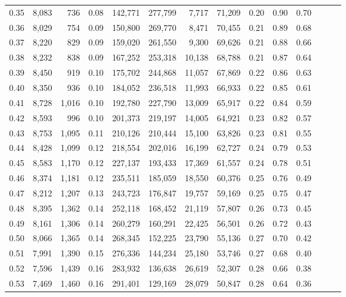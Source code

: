 \begin{tabular}{rrrrrrrrrrrrrr}
0.35 &  8,083 &    736 &  0.08 &  142,771 &  277,799 &   7,717 &  71,209 &  0.20 &  0.90 &      0.70 \\
0.36 &  8,029 &    754 &  0.09 &  150,800 &  269,770 &   8,471 &  70,455 &  0.21 &  0.89 &      0.68 \\
0.37 &  8,220 &    829 &  0.09 &  159,020 &  261,550 &   9,300 &  69,626 &  0.21 &  0.88 &      0.66 \\
0.38 &  8,232 &    838 &  0.09 &  167,252 &  253,318 &  10,138 &  68,788 &  0.21 &  0.87 &      0.64 \\
0.39 &  8,450 &    919 &  0.10 &  175,702 &  244,868 &  11,057 &  67,869 &  0.22 &  0.86 &      0.63 \\
0.40 &  8,350 &    936 &  0.10 &  184,052 &  236,518 &  11,993 &  66,933 &  0.22 &  0.85 &      0.61 \\
0.41 &  8,728 &  1,016 &  0.10 &  192,780 &  227,790 &  13,009 &  65,917 &  0.22 &  0.84 &      0.59 \\
0.42 &  8,593 &    996 &  0.10 &  201,373 &  219,197 &  14,005 &  64,921 &  0.23 &  0.82 &      0.57 \\
0.43 &  8,753 &  1,095 &  0.11 &  210,126 &  210,444 &  15,100 &  63,826 &  0.23 &  0.81 &      0.55 \\
0.44 &  8,428 &  1,099 &  0.12 &  218,554 &  202,016 &  16,199 &  62,727 &  0.24 &  0.79 &      0.53 \\
0.45 &  8,583 &  1,170 &  0.12 &  227,137 &  193,433 &  17,369 &  61,557 &  0.24 &  0.78 &      0.51 \\
0.46 &  8,374 &  1,181 &  0.12 &  235,511 &  185,059 &  18,550 &  60,376 &  0.25 &  0.76 &      0.49 \\
0.47 &  8,212 &  1,207 &  0.13 &  243,723 &  176,847 &  19,757 &  59,169 &  0.25 &  0.75 &      0.47 \\
0.48 &  8,395 &  1,362 &  0.14 &  252,118 &  168,452 &  21,119 &  57,807 &  0.26 &  0.73 &      0.45 \\
0.49 &  8,161 &  1,306 &  0.14 &  260,279 &  160,291 &  22,425 &  56,501 &  0.26 &  0.72 &      0.43 \\
0.50 &  8,066 &  1,365 &  0.14 &  268,345 &  152,225 &  23,790 &  55,136 &  0.27 &  0.70 &      0.42 \\
0.51 &  7,991 &  1,390 &  0.15 &  276,336 &  144,234 &  25,180 &  53,746 &  0.27 &  0.68 &      0.40 \\
0.52 &  7,596 &  1,439 &  0.16 &  283,932 &  136,638 &  26,619 &  52,307 &  0.28 &  0.66 &      0.38 \\
0.53 &  7,469 &  1,460 &  0.16 &  291,401 &  129,169 &  28,079 &  50,847 &  0.28 &  0.64 &      0.36 \\

\end{tabular}
